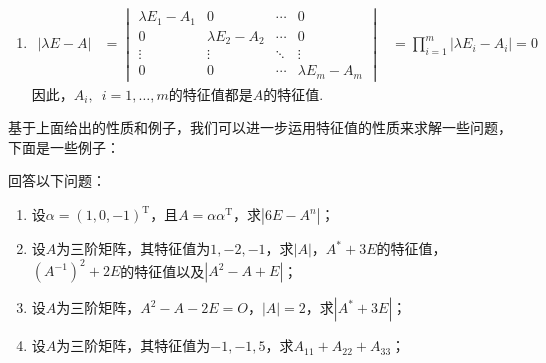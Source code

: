 \begin{solution}
\begin{enumerate}
        \item \begin{align*}
                  |\lambda E-A| & =\begin{vmatrix}
                                       \lambda E_1-A_1 & 0               & \cdots & 0               \\
                                       0               & \lambda E_2-A_2 & \cdots & 0               \\
                                       \vdots          & \vdots          & \ddots & \vdots          \\
                                       0               & 0               & \cdots & \lambda E_m-A_m
                                   \end{vmatrix}
                                & =\prod_{i=1}^{m}|\lambda E_i-A_i|=0
              \end{align*}
              因此，$A_i,\enspace i=1,\ldots,m$的特征值都是$A$的特征值.
    \end{enumerate}
\end{solution}

基于上面给出的性质和例子，我们可以进一步运用特征值的性质来求解一些问题，下面是一些例子：
\begin{example}
    回答以下问题：
    \begin{enumerate}
        \item 设$\alpha=(1,0,-1)^\mathrm{T}$，且$A=\alpha\alpha^\mathrm{T}$，求$|6E-A^n|$；

        \item 设$A$为三阶矩阵，其特征值为$1,-2,-1$，求$|A|$，$A^*+3E$的特征值，$(A^{-1})^2+2E$的特征值以及$|A^2-A+E|$；

        \item 设$A$为三阶矩阵，$A^2-A-2E=O$，$|A|=2$，求$|A^*+3E|$；

        \item 设$A$为三阶矩阵，其特征值为$-1,-1,5$，求$A_{11}+A_{22}+A_{33}$；
    \end{enumerate}
\end{example}

